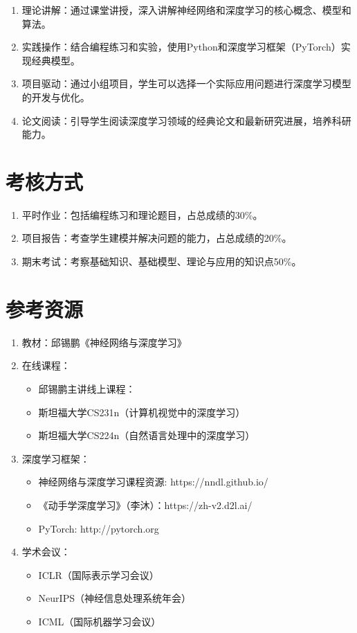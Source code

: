 \documentclass{../nndlcourse}
\begin{document}
\begin{enumerate}
    \item 理论讲解：通过课堂讲授，深入讲解神经网络和深度学习的核心概念、模型和算法。
    \item 实践操作：结合编程练习和实验，使用Python和深度学习框架（PyTorch）实现经典模型。
    \item 项目驱动：通过小组项目，学生可以选择一个实际应用问题进行深度学习模型的开发与优化。
    \item 论文阅读：引导学生阅读深度学习领域的经典论文和最新研究进展，培养科研能力。
\end{enumerate}

\section*{考核方式}

\begin{enumerate}
    \item 平时作业：包括编程练习和理论题目，占总成绩的30\%。
    \item 项目报告：考查学生建模并解决问题的能力，占总成绩的20\%。
    \item 期末考试：考察基础知识、基础模型、理论与应用的知识点50\%。
\end{enumerate}

\section*{参考资源}

\begin{enumerate}
    \item 教材：邱锡鹏《神经网络与深度学习》
    \item 在线课程：
    \begin{itemize}
        \item 邱锡鹏主讲线上课程：
        \item 斯坦福大学CS231n（计算机视觉中的深度学习）
        \item 斯坦福大学CS224n（自然语言处理中的深度学习）
    \end{itemize}
    \item 深度学习框架：
    \begin{itemize}
        \item 神经网络与深度学习课程资源: https://nndl.github.io/
        \item 《动手学深度学习》（李沐）：https://zh-v2.d2l.ai/
        \item PyTorch: http://pytorch.org
    \end{itemize}
    \item 学术会议：
    \begin{itemize}
        \item ICLR（国际表示学习会议）
        \item NeurIPS（神经信息处理系统年会）
        \item ICML（国际机器学习会议）
    \end{itemize}
\end{enumerate}
\end{document}
